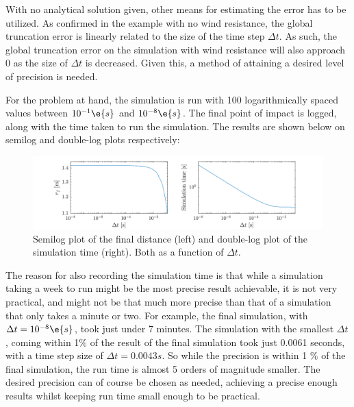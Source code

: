\documentclass[a4paper,10pt]{article} 	%
\numberwithin{equation}{section}
\begin{document}
 	With no analytical solution given, other means for estimating the error has to be utilized. As confirmed in the example with no wind resistance, the global truncation error is linearly related to the size of the time step $ \Delta t $. As such, the global truncation error on the simulation with wind resistance will also approach 0 as the size of $ \Delta t $ is decreased. Given this, a method of attaining a desired level of precision is needed.
 	
 	For the problem at hand, the simulation is run with 100 logarithmically spaced values between $ 10^{-1} \e{s}$ and $ 10^{-8} \e{s} $. The final point of impact is logged, along with the time taken to run the simulation. The results are shown below on semilog and double-log plots respectively:
 	\begin{figure}[H]
 		\centering
 		\includegraphics[width = \linewidth]{simtime.pdf}
 		\caption{Semilog plot of the final distance (left) and double-log plot of the simulation time (right). Both as a function of $ \Delta t $.}
 		\label{fig:simtime}
 	\end{figure}
 	The reason for also recording the simulation time is that while a simulation taking a week to run might be the most precise result achievable, it is not very practical, and might not be that much more precise than that of a simulation that only takes a minute or two. For example, the final simulation, with $ \Delta t = 10^{-8} \e{s} $, took just under 7 minutes. The simulation with the smallest $ \Delta t $, coming within 1\% of the result of the final simulation took just 0.0061 seconds, with a time step size of $ \Delta t = 0.0043 s $. So while the precision is within 1 \% of the final simulation, the run time is almost 5 orders of magnitude smaller. The desired precision can of course be chosen as needed, achieving a precise enough results whilst keeping run time small enough to be practical.
 	
 	
\end{document}
